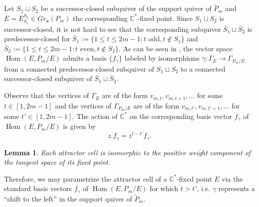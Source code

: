\documentclass{amsart}
\newtheorem{lemma}[theorem]{Lemma}
\numberwithin{equation}{section}
\newcommand{\CC}{\mathbb{C}}
\newcommand{\bfe}{\mathbf{e}}
\newcommand{\Hom}{\operatorname{Hom}}
\begin{document}
    Let $S_1\sqcup S_2$ be a successor-closed subquiver of the support quiver of $\tilde P_m$ and $E=E_{S_1}^{S_2}\in Gr_\bfe(P_m)$ the corresponding $\CC^*$-fixed point.
    Since $S_1\sqcup S_2$ is successor-closed, it is not hard to see that the corresponding subquiver $\bar{S}_1\sqcup\bar{S}_2$ is predecessor-closed for $\bar{S}_1:=\{1\le t\le 2m-1:\text{$t$ odd},t\notin S_1\}$ and $\bar{S}_2:=\{1\le t\le 2m-1:\text{$t$ even},t\notin S_2\}$.
    As can be seen in \cite[Prop. 2.0.2]{cerulli irelli-esposito}, the vector space $\Hom(E,P_m/E)$ admits a basis $\{f_\gamma\}$ labeled by isomorphisms $\gamma:\Gamma_E\to\Gamma_{P_m/E}$ from a connected predecessor-closed subquiver of $S_1\sqcup S_2$ to a connected successor-closed subquiver of $\bar{S}_1\sqcup\bar{S}_2$.

    Observe that the vertices of $\Gamma_E$ are of the form $v_{m,t},v_{m,t+1},\ldots$ for some $t\in[1,2m-1]$ and the vertices of $\Gamma_{P_m/E}$ are of the form $v_{m,t'},v_{m,t'+1},\ldots$ for some $t'\in[1,2m-1]$.
    The action of $\CC^*$ on the corresponding basis vector $f_\gamma$ of $\Hom(E,P_m/E)$ is given by
    \[z.f_\gamma=z^{t-t'}f_\gamma.\]

    \begin{lemma}
      Each attractor cell is isomorphic to the positive weight component of the tangent space of its fixed point.
    \end{lemma}

    Therefore, we may parametrize the attractor cell of a $\CC^*$-fixed point $E$ via the standard basis vectors $f_\gamma$ of $\Hom(E,P_m/E)$ for which $t>t'$, i.e. $\gamma$ represents a ``shift to the left'' in the support quiver of $\tilde P_m$.
\end{document}
